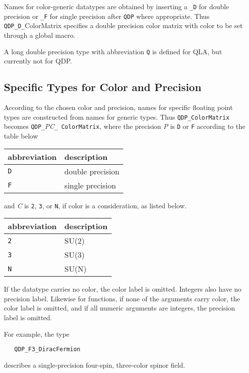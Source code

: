 \documentclass{article}
\newcommand{\tColorMatrix}{QDP\ttdash ColorMatrix }
\newcommand{\ttdash}{{\tt \_}}
\begin{document}
Names for color-generic datatypes are obtained by inserting a
\ttdash{\tt D} for double precision or \ttdash{\tt F} for single
precision after {\tt QDP} where appropriate.  Thus {\tt
QDP}\ttdash{\tt D}\ttdash{ColorMatrix} specifies a double precision color
matrix with color to be set through a global macro.

A long double precision type with abbreviation {\tt Q} is defined for
QLA, but currently not for QDP.

\subsection{Specific Types for Color and Precision}

According to the chosen color and precision, names for specific
floating point types are constructed from names for generic types.
Thus {\tt \tColorMatrix} becomes {\tt QDP}\ttdash{\it PC}\ttdash{\tt
ColorMatrix}, where the precision {\it P} is {\tt D} or {\tt F}
according to the table below
\begin{center}
\begin{tabular}{|l|l|}
\hline
abbreviation & description \\
\hline
{\tt D}            & double precision \\
{\tt F}            & single precision \\
\hline
\end{tabular}
\end{center}
and {\it C} is {\tt 2}, {\tt 3}, or {\tt N}, if color is a
consideration, as listed below.
\begin{center}
\begin{tabular}{|l|l|}
\hline
abbreviation & description \\
\hline
{\tt 2}            & SU(2) \\
{\tt 3}            & SU(3) \\
{\tt N}            & SU(N) \\
\hline
\end{tabular}
\end{center}
If the datatype carries no color, the color label is omitted.
Integers also have no precision label.  Likewise for functions, if
none of the arguments carry color, the color label is omitted, and if
all numeric arguments are integers, the precision label is omitted.

For example, the type
%
\begin{verbatim}
   QDP_F3_DiracFermion
\end{verbatim}
%
describes a single-precision four-spin, three-color spinor field.
\end{document}
